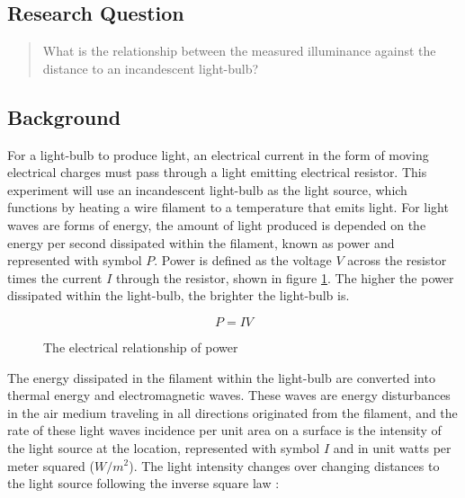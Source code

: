 \documentclass[a4paper,12pt]{article}
\begin{document}
\subsection{Research Question}
\begin{quote}
 What is the relationship between the measured illuminance against the distance to an incandescent light-bulb?
\end{quote}

\subsection{Background}

For a light-bulb to produce light, an electrical current in the form of moving electrical charges must  pass through a light emitting electrical resistor. This experiment will use an incandescent light-bulb as the light source, which functions by heating a wire filament to a temperature that emits light. For light waves are forms of energy, the amount of light produced is depended on the energy per second dissipated within the filament, known as power and represented with symbol $P$. Power is defined as the voltage $V$ across the resistor times the current $I$ through the resistor, shown in figure \ref{eq:work}. The higher the power dissipated within the light-bulb, the brighter the light-bulb is.



\begin{figure}[H]
    \[
    P = IV
    \]
    \caption{The electrical relationship of power}
    \label{eq:work}
\end{figure}

The energy dissipated in the filament within the light-bulb are converted into thermal energy and electromagnetic waves. These waves are energy disturbances in the air medium traveling in all directions originated from the filament, and the rate of these light waves incidence per unit area on a surface is the intensity of the light source at the location, represented with symbol $I$ and in unit watts per meter squared ($\si{W/m^2}$). The light intensity changes over changing distances to the light source following the inverse square law \parencite{isl}:
\end{document}
